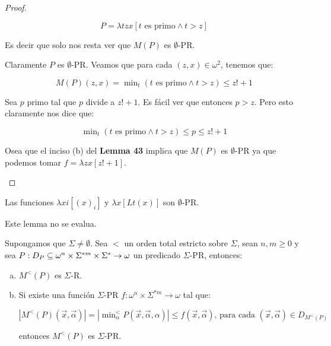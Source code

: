 \begin{proof}
\begin{enumerate}[a)]
        \[
          P = \lambda tzx\left[t \text{ es primo} \wedge t > z\right]
        \]

        \par Es decir que solo nos resta ver que $M(P)$ es $\emptyset$-PR.
        \par Claramente $P$ es $\emptyset$-PR. Veamos que para cada $(z,x) \in \omega^{2}$, tenemos que:

        \[
          M(P)(z,x) = \min\nolimits_{t}\left(t \text{ es primo} \wedge t > z\right) \leq z! + 1
        \]

        \par Sea $p$ primo tal que $p$ divide a $z!+1$. Es fácil ver que entonces $p > z$. Pero esto claramente nos dice
        que:

        \[
          \min\nolimits_{t}\left(t \text{ es primo} \wedge t > z\right) \leq p \leq z! + 1
        \]

        \par Osea que el inciso (b) del \textbf{Lemma 43} implica que $M(P)$ es $\emptyset$-PR ya que podemos tomar
        $f = \lambda zx\left[z! + 1\right]$.
    \end{enumerate}
  \end{proof}

  \begin{lemma}
    \par Las funciones $\lambda xi\left[(x)_{i}\right]$ y $\lambda x\left[Lt(x)\right]$ son $\emptyset$-PR.
  \end{lemma}

  \begin{lemma}
    \par Este lemma no se evalua.
  \end{lemma}

  \begin{lemma}
    \par Supongamos que $\Sigma \neq \emptyset$. Sea $<$ un orden total estricto sobre $\Sigma$, sean $n, m \geq 0$ y
    sea $P: D_{P} \subseteq \omega^{n} \times \Sigma^{\ast m} \times \Sigma^{\ast} \rightarrow \omega$ un predicado
    $\Sigma$-PR, entonces:

    \begin{enumerate}[a)]
      \item $M^{<}(P)$ es $\Sigma$-R.
      \item Si existe una función $\Sigma$-PR $f: \omega^{n} \times \Sigma^{\ast m} \rightarrow \omega$ tal que:

        \[
          \left\vert M^{<}(P)(\vec{x},\vec{\alpha})\right\vert = \left\vert \min\nolimits_{\alpha}^{<} P(\vec{x},
          \vec{\alpha},\alpha)\right\vert \leq f(\vec{x},\vec{\alpha}) \text{, para cada } (\vec{x},\vec{\alpha}) \in
          D_{M^{< }(P)}
        \]

        \par entonces $M^{<}(P)$ es $\Sigma$-PR.
    \end{enumerate}
  \end{lemma}

